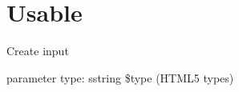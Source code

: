 \hypertarget{_usable-example}{\section{Usable}
}
Create input

parameter type\-: sstring \$type (H\-T\-M\-L5 types)


\begin{DoxyCodeInclude}
\end{DoxyCodeInclude}
 